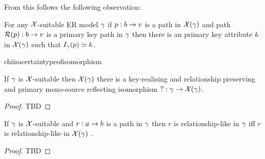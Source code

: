 From this follows the following observation:

\begin{observation}
\label{pathinjectionobservation}
For any $\mathcal{X}$-suitable ER model $\gamma$ if $p:b \rightarrow v$ is a path in $\mathcal{X}(\gamma)$ and  path $\mathcal{R}(p):b \rightarrow v$ is a primary key path in $\gamma$  then there is an primary key attribute $k$ in $\mathcal{X}(\gamma)$ such that $I_\gamma(p) \simeq k$. 
\end{observation}

chiisacertaintypeofisomorphism
\begin{lemma}
\label{chiisacertaintypeofisomorphism}
If $\gamma$ is $\mathcal{X}$-suitable  then $\mathcal{X}(\gamma)$ there is a key-realising and
relationship preserving  and primary mono-source reflecting isomorphism $?: \gamma \rightarrow \mathcal{X}(\gamma)$. 
\end{lemma}
\begin{proof}
TBD 
\end{proof}

\begin{lemma}
\label{relationshiplikecarrythroughlemma}
If $\gamma$ is $\mathcal{X}$-suitable  and $r:a \rightarrow b$ is a path in $\gamma$ then $r$ is relationship-like in $\gamma$ iff $r$ is relationship-like in $\mathcal{X}(\gamma)$ .
\end{lemma}
\begin{proof}
TBD
\end{proof}

